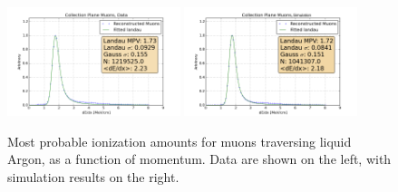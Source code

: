 \begin{figure}[tb]
  \centering
  \includegraphics[width=0.45\textwidth]{lartpc_figures/collection_muons_total.png}
  \includegraphics[width=0.45\textwidth]{lartpc_figures/collection_muons_total_sim.png}
  \caption[Muon $dE/dx$ Distributions]{Most probable ionization amounts for muons traversing liquid Argon, as a function of momentum.  Data are shown on the left, with simulation results on the right.}
  \label{fig:coll_mpv_muons}
\end{figure}

